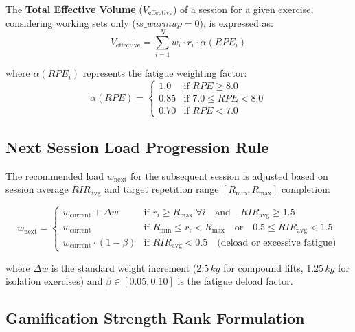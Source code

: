 The \textbf{Total Effective Volume} ($V_{\text{effective}}$) of a session for a given exercise, considering working sets only ($is\_warmup = 0$), is expressed as:
\begin{equation}
    V_{\text{effective}} = \sum_{i=1}^{N} w_i \cdot r_i \cdot \alpha(RPE_i)
\end{equation}

where $\alpha(RPE_i)$ represents the fatigue weighting factor:
\begin{equation}
    \alpha(RPE) = \begin{cases}
        1.0 & \text{if } RPE \ge 8.0 \\
        0.85 & \text{if } 7.0 \le RPE < 8.0 \\
        0.70 & \text{if } RPE < 7.0
    \end{cases}
\end{equation}

\subsection{Next Session Load Progression Rule}

The recommended load $w_{\text{next}}$ for the subsequent session is adjusted based on session average $RIR_{\text{avg}}$ and target repetition range $[R_{\text{min}}, R_{\text{max}}]$ completion:

\begin{equation}
    w_{\text{next}} = \begin{cases}
        w_{\text{current}} + \Delta w & \text{if } r_i \ge R_{\text{max}} \;\forall i \quad \text{and} \quad RIR_{\text{avg}} \ge 1.5 \\
        w_{\text{current}} & \text{if } R_{\text{min}} \le r_i < R_{\text{max}} \quad \text{or} \quad 0.5 \le RIR_{\text{avg}} < 1.5 \\
        w_{\text{current}} \cdot (1 - \beta) & \text{if } RIR_{\text{avg}} < 0.5 \quad \text{(deload or excessive fatigue)}
    \end{cases}
\end{equation}

where $\Delta w$ is the standard weight increment ($2.5\,kg$ for compound lifts, $1.25\,kg$ for isolation exercises) and $\beta \in [0.05, 0.10]$ is the fatigue deload factor.

\subsection{Gamification Strength Rank Formulation}

